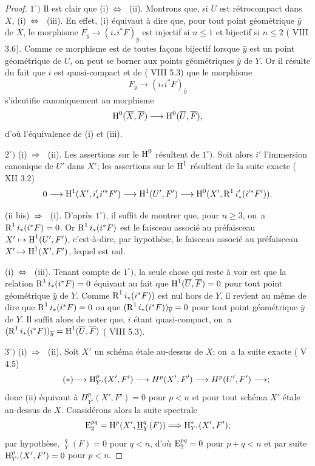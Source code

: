 \skpt
\begin{proof}
$1^\circ)$ Il est clair que \textup{(i)}~$\Ssi$~ \textup{(ii)}.
Montrons que, si $U$ est r\'etrocompact dans $X$, \textup{(i)}~$\Ssi$~
\textup{(iii)}. En effet, \textup{(i)} \'equivaut \`a dire que, pour
tout point g\'eom\'etrique $\bar{y}$ de $X$, le morphisme
$F_{\bar{y}}\to (i_*i^*F)_{\bar{y}}$ est injectif si $n\leq 1$ et
bijectif si $n\leq 2$ ( VIII 3.6). Comme ce morphisme est de
toutes fa\c cons bijectif lorsque $\bar{y}$ est un point
g\'eom\'etrique de $U$, on peut se borner aux points g\'eom\'etriques
$\bar{y}$ de $Y$. Or il r\'esulte du fait que $i$ est quasi-compact
et de ( VIII 5.3) que le morphisme
$$F_{\bar{y}}\to (i_*i^*F)_{\bar{y}}$$
s'identifie canoniquement au morphisme
$$
\H^0(\bar{X}, \bar{F})\to \H^0(\bar{U}, \bar{F}),
$$
d'o\`u l'\'equivalence de \textup{(i)} et \textup{(iii)}.

$2^\circ)$ \textup{(i)}~$\To$~ \textup{(ii)}. Les assertions sur le $\operatorname{H}^0$ r\'esultent de $1^\circ)$. Soit alors $i'$ l'immersion canonique de $U'$ dans $X'$; les assertions sur le $\operatorname{H}^1$ r\'esultent de la suite exacte ( XII 3.2)
$$0\to \H^1(X', i'_*i'^*F')\to \H^1(U', F')\to \H^0(X', \R^1i'_*(i'^*F')).
$$

(ii bis)~$\To$~ \textup{(i)}. D'apr\`es $1^\circ)$, il suffit de montrer que, pour $n\geq 3$, on~a $\operatorname{R}^1i_*(i^*F)=0$. Or $\operatorname{R}^1i_*(i^*F)$ est le faisceau associ\'e au pr\'efaisceau $X'\mto \H^1(U', F')$, c'est-\`a-dire, par hypoth\`ese, le faisceau associ\'e au pr\'efaisceau $X'\mto \H^1(X', F')$, lequel est nul.

\textup{(i)}~$\Ssi$~ \textup{(iii)}. Tenant compte de $1^\circ)$, la seule chose qui reste \`a voir est que la relation $\operatorname{R}^1i_*(i^*F)=0$ \'equivaut au fait que $\operatorname{H}^1(\overline U, \overline F)=0$ pour tout point g\'eom\'etrique $\bar y$ de $Y$. Comme $\operatorname{R}^1i_*(i^*F))$ est nul hors de $Y$, il revient au m\^eme de dire que $\operatorname{R}^1i_*(i^*F)=0$ ou que $(\operatorname{R}^1i_*(i^*F))_{\overline y}=0$ pour tout point g\'eom\'etrique $\bar y$ de $Y$. Il suffit alors de noter que, $i$ \'etant quasi-compact, on~a $(\operatorname{R}^1i_*(i^*F))_{\overline y}=\operatorname{H}^1(\overline U, \overline F)$ ( VIII 5.3).

$3^\circ)$ \textup{(i)}~$\To$~ \textup{(ii)}. Soit $X'$ un sch\'ema \'etale au-dessus de $X$; on~a la suite exacte ( V 4.5)
\begin{equation*} \label{eq:XIV.1.1.*} \tag{$*$} {\to \H^p_{Y'}(X', F')\to H^p(X', F')\to H^p(U', F')\to};
\end{equation*}
donc \textup{(ii)} \'equivaut \`a $H^p_{Y'}(X', F')=0$ pour $p<n$ et pour tout sch\'ema $X'$ \'etale au-dessus de $X$. Consid\'erons alors la suite spectrale
$$
\E_2^{pq}=\H^p(X', {\mathop{\underline{\mathrm{H}}}\nolimits}_Y^q(F))\To \H_{Y'}^*(X', F');$$
par hypoth\`ese, ${\mathop{\underline{\mathrm{H}}}\nolimits}_Y^q(F)=0$ pour $q<n$, d'o\`u $\operatorname{E}_2^{pq}=0$ pour $p+q<n$ et par suite $\operatorname{H}_{Y'}^p(X', F')=0$ pour $p<n$.


\end{proof}
